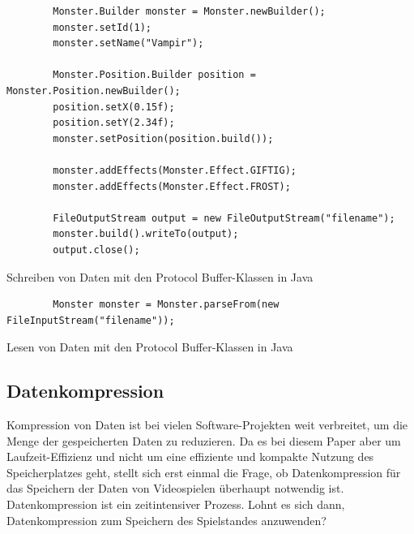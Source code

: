 \begin{listing}[htp]
    \begin{verbatim} 
        Monster.Builder monster = Monster.newBuilder();
        monster.setId(1);
        monster.setName("Vampir");

        Monster.Position.Builder position = Monster.Position.newBuilder();
        position.setX(0.15f);
        position.setY(2.34f);
        monster.setPosition(position.build());

        monster.addEffects(Monster.Effect.GIFTIG);
        monster.addEffects(Monster.Effect.FROST);

        FileOutputStream output = new FileOutputStream("filename");
        monster.build().writeTo(output);
        output.close();
    \end{verbatim}
    \caption{Schreiben von Daten mit den Protocol Buffer-Klassen in Java}
    \label{lst:protobufJavaWrite}
\end{listing}

\begin{listing}[htp]
    \begin{verbatim} 
        Monster monster = Monster.parseFrom(new FileInputStream("filename"));
    \end{verbatim}
    \caption{Lesen von Daten mit den Protocol Buffer-Klassen in Java}
    \label{lst:protobufJavaRead}
\end{listing}



\subsection{Datenkompression} \label{ssec:kompression}
Kompression von Daten ist bei vielen Software-Projekten weit verbreitet, um die Menge der gespeicherten Daten zu reduzieren. Da es bei diesem Paper aber um Laufzeit-Effizienz und nicht um eine effiziente und kompakte Nutzung des Speicherplatzes geht, stellt sich erst einmal die Frage, ob Datenkompression für das Speichern der Daten von Videospielen überhaupt notwendig ist. Datenkompression ist ein zeitintensiver Prozess. Lohnt es sich dann, Datenkompression zum Speichern des Spielstandes anzuwenden? 


